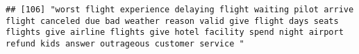 \documentclass[
]{article}
\begin{document}
\begin{verbatim}
## [106] "worst flight experience delaying flight waiting pilot arrive flight canceled due bad weather reason valid give flight days seats flights give airline flights give hotel facility spend night airport refund kids answer outrageous customer service "                                                                                                                                                                                                                                                                                                                                                                                                                                                                                                                                                                                                                                                                                                                                                                                                                                                                                                                                                                                                                                                                                                                                                                                                                                                                                                                                                                                                                                                                                                                                         

\end{verbatim}
\end{document}
